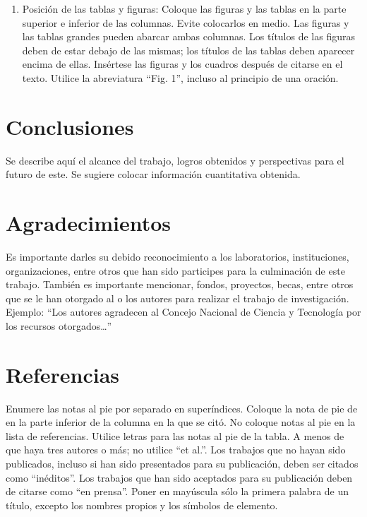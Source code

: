     \begin{enumerate}
        \item Posición de las tablas y figuras: Coloque las figuras y las tablas en la parte superior e inferior de las columnas. Evite colocarlos en medio. Las figuras y las tablas grandes pueden abarcar ambas columnas. Los títulos de las figuras deben de estar debajo de las mismas; los títulos de las tablas deben aparecer encima de ellas. Insértese las figuras y los cuadros después de citarse en el texto. Utilice la abreviatura “Fig. 1”, incluso al principio de una oración. 
    \end{enumerate}
    
    \section{Conclusiones}
    
    Se describe aquí el alcance del trabajo, logros obtenidos y perspectivas para el futuro de este. Se sugiere colocar información cuantitativa obtenida.
    
    \section{Agradecimientos}
    
    Es importante darles su debido reconocimiento a los laboratorios, instituciones, organizaciones, entre otros que han sido participes para la culminación de este trabajo. También es importante mencionar, fondos, proyectos, becas, entre otros que se le han otorgado al o los autores para realizar el trabajo de investigación. Ejemplo: “Los autores agradecen al Concejo Nacional de Ciencia y Tecnología por los recursos otorgados…”
    
    \section*{Referencias}
    
    Enumere las notas al pie por separado en superíndices. Coloque la nota de pie de en la parte inferior de la columna en la que se citó. No coloque notas al pie en la lista de referencias. Utilice letras para las notas al pie de la tabla.
    A menos de que haya tres autores o más; no utilice “et al.”. Los trabajos que no hayan sido publicados, incluso si han sido presentados para su publicación, deben ser citados como “inéditos”. Los trabajos que han sido aceptados para su publicación deben de citarse como “en prensa”. Poner en mayúscula sólo la primera palabra de un título, excepto los nombres propios y los símbolos de elemento. 
    
